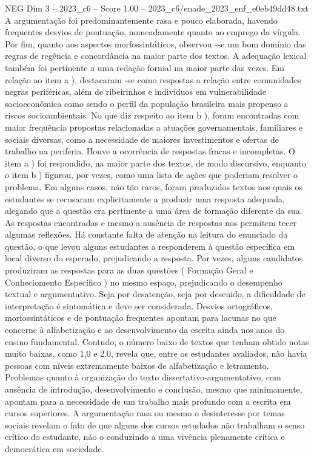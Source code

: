 \begin{textsample}{NEG Dim 3 – 2023\_c6 – Score 1.00 – 2023\_c6/enade\_2023\_enf\_e0eb49dd48.txt}
A argumentação foi predominantemente rasa e pouco elaborada, havendo frequentes desvios de pontuação, nomeadamente quanto ao emprego da vírgula.
Por fim, quanto aos aspectos morfossintáticos, observou -se um bom domínio das regras de regência e concordância na maior parte dos textos.
A adequação lexical também foi pertinente a uma redação formal na maior parte das vezes.
Em relação ao item a ), destacaram -se como respostas a relação entre comunidades negras periféricas, além de ribeirinhos e indivíduos em vulnerabilidade socioeconômica como sendo o perfil da população brasileira mais propenso a riscos socioambientais.
No que diz respeito ao item b ), foram encontradas com maior frequência propostas relacionadas a atuações governamentais, familiares e sociais diversas, como a necessidade de maiores investimentos e ofertas de trabalho na periferia.
Houve a ocorrência de respostas fracas e incompletas.
O item a ) foi respondido, na maior parte dos textos, de modo discursivo, enquanto o item b ) figurou, por vezes, como uma lista de ações que poderiam resolver o problema.
Em alguns casos, não tão raros, foram produzidos textos nos quais os estudantes se recusaram explicitamente a produzir uma resposta adequada, alegando que a questão era pertinente a uma área de formação diferente da sua.
As respostas encontradas e mesmo a ausência de respostas nos permitem tecer algumas reflexões.
Há constante falta de atenção na leitura do enunciado da questão, o que levou alguns estudantes a responderem à questão específica em local diverso do esperado, prejudicando a resposta.
Por vezes, alguns candidatos produziram as respostas para as duas questões ( Formação Geral e Conheciomento Específico ) no mesmo espaço, prejudicando o desempenho textual e argumentativo.
Seja por desatenção, seja por descuido, a dificuldade de interpretação é sintomática e deve ser considerada.
Desvios ortográficos, morfossintáticos e de pontuação frequentes apontam para lacunas no que concerne à alfabetização e ao desenvolvimento da escrita ainda nos anos do ensino fundamental.
Contudo, o número baixo de textos que tenham obtido notas muito baixas, como 1,0 e 2,0, revela que, entre os estudantes avaliados, não havia pessoas com níveis extremamente baixos de alfabetização e letramento.
Problemas quanto à organização do texto dissertativo-argumentativo, com ausência de introdução, desenvolvimento e conclusão, mesmo que minimamente, apontam para a necessidade de um trabalho mais profundo com a escrita em cursos superiores.
A argumentação rasa ou mesmo o desinteresse por temas sociais revelam o fato de que alguns dos cursos estudados não trabalham o senso crítico do estudante, não o conduzindo a uma vivência plenamente crítica e democrática em sociedade.

\end{textsample}
